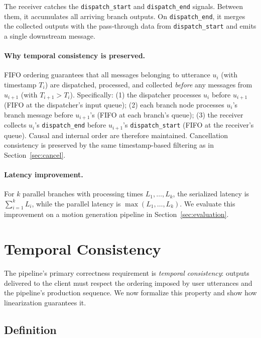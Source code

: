 \documentclass[11pt,a4paper]{article}
\begin{document}
The receiver catches the \texttt{dispatch\_start} and \texttt{dispatch\_end} signals. Between them, it accumulates all arriving branch outputs. On \texttt{dispatch\_end}, it merges the collected outputs with the pass-through data from \texttt{dispatch\_start} and emits a single downstream message.

\paragraph{Why temporal consistency is preserved.}
FIFO ordering guarantees that all messages belonging to utterance $u_i$ (with timestamp $T_i$) are dispatched, processed, and collected \emph{before} any messages from $u_{i+1}$ (with $T_{i+1} > T_i$). Specifically: (1) the dispatcher processes $u_i$ before $u_{i+1}$ (FIFO at the dispatcher's input queue); (2) each branch node processes $u_i$'s branch message before $u_{i+1}$'s (FIFO at each branch's queue); (3) the receiver collects $u_i$'s \texttt{dispatch\_end} before $u_{i+1}$'s \texttt{dispatch\_start} (FIFO at the receiver's queue). Causal and internal order are therefore maintained. Cancellation consistency is preserved by the same timestamp-based filtering as in Section~\ref{sec:cancel}.

\paragraph{Latency improvement.}
For $k$ parallel branches with processing times $L_1, \ldots, L_k$, the serialized latency is $\sum_{i=1}^{k} L_i$, while the parallel latency is $\max(L_1, \ldots, L_k)$. We evaluate this improvement on a motion generation pipeline in Section~\ref{sec:evaluation}.

\section{Temporal Consistency}
\label{sec:temporal}

The pipeline's primary correctness requirement is \emph{temporal consistency}: outputs delivered to the client must respect the ordering imposed by user utterances and the pipeline's production sequence. We now formalize this property and show how linearization guarantees it.

\subsection{Definition}
\end{document}
